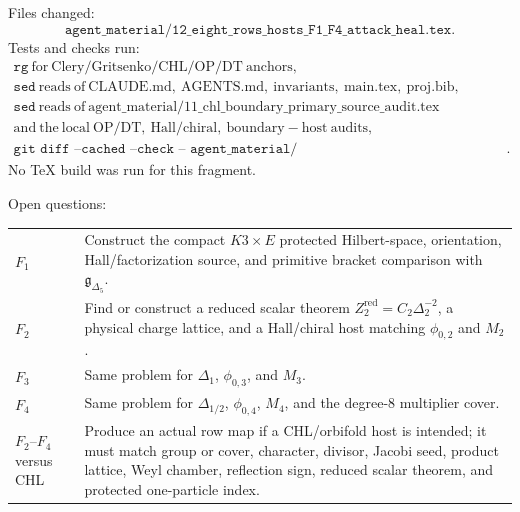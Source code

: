 \begin{remark}
Files changed:
\[
\texttt{agent\_material/12\_eight\_rows\_hosts\_F1\_F4\_attack\_heal.tex}.
\]
Tests and checks run:
\[
\begin{array}{l}
\texttt{rg}\ \mathrm{for\ Clery/Gritsenko/CHL/OP/DT\ anchors},\\
\texttt{sed}\ \mathrm{reads\ of\ CLAUDE.md,\ AGENTS.md,\ invariants,\ main.tex,\ proj.bib,}\\
\texttt{sed}\ \mathrm{reads\ of\ agent\_material/11\_chl\_boundary\_primary\_source\_audit.tex}\\
\mathrm{and\ the\ local\ OP/DT,\ Hall/chiral,\ boundary-host\ audits,}\\
\texttt{git diff --cached --check -- agent\_material/12\_eight\_rows\_hosts\_F1\_F4\_attack\_heal.tex}.
\end{array}
\]
No TeX build was run for this fragment.

Open questions:
\begin{center}
\small
\begin{tabular}{p{}|p{}}
\(F_1\)&
Construct the compact \(K3\times E\) protected Hilbert-space,
orientation, Hall/factorization source, and primitive bracket comparison
with \(\mathfrak g_{\Delta_5}\).\\
\(F_2\)&
Find or construct a reduced scalar theorem
\(Z_2^{\mathrm{red}}=C_2\Delta_2^{-2}\), a physical charge lattice, and
a Hall/chiral host matching \(\phi_{0,2}\) and \(M_2\).\\
\(F_3\)&
Same problem for \(\Delta_1\), \(\phi_{0,3}\), and \(M_3\).\\
\(F_4\)&
Same problem for \(\Delta_{1/2}\), \(\phi_{0,4}\), \(M_4\), and the
degree-\(8\) multiplier cover.\\
\(F_2\)--\(F_4\) versus CHL&
Produce an actual row map if a CHL/orbifold host is intended; it must
match group or cover, character, divisor, Jacobi seed, product lattice,
Weyl chamber, reflection sign, reduced scalar theorem, and protected
one-particle index.
\end{tabular}
\end{center}
\end{remark}
